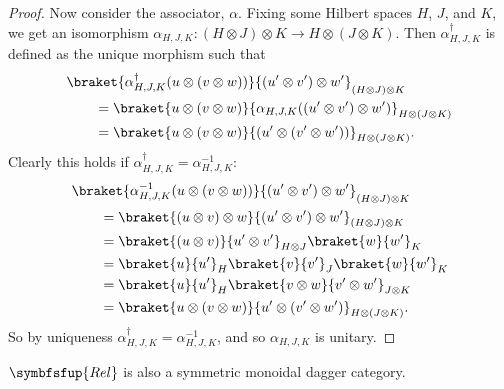 \documentclass[fleqn]{NotesClass}
\makeatletter
\newcommand{\c@egory}[1]{\symbfsfup{#1}}
\newcommand{\Rel}{\c@egory{Rel}}
\makeatother
\begin{document}
\begin{lma}{}{}
\begin{proof}
            Now consider the associator, \(\alpha\).
            Fixing some Hilbert spaces \(H\), \(J\), and \(K\), we get an isomorphism \(\alpha_{H,J,K} \colon (H \otimes J) \otimes K \to H \otimes (J \otimes K)\).
            Then \(\alpha_{H,J,K}^\dagger\) is defined as the unique morphism such that
            \begin{align}
                &\braket{\alpha_{H,J,K}^\dagger(u \otimes (v \otimes w))}{(u' \otimes v') \otimes w'}_{(H\otimes J)\otimes K}\\
                &\qquad= \braket{u \otimes (v \otimes w)}{\alpha_{H,J,K}((u' \otimes v') \otimes w')}_{H\otimes(J\otimes K)}\\
                &\qquad= \braket{u \otimes (v \otimes w)}{(u' \otimes (v' \otimes w'))}_{H\otimes(J\otimes K)}.
            \end{align}
            Clearly this holds if \(\alpha_{H,J,K}^\dagger = \alpha_{H,J,K}^{-1}\):
            \begin{align}
                &\braket{\alpha_{H,J,K}^{-1}(u \otimes (v \otimes w))}{(u' \otimes v') \otimes w'}_{(H\otimes J)\otimes K}\\
                &\qquad= \braket{(u \otimes v) \otimes w}{(u' \otimes v') \otimes w'}_{(H\otimes J)\otimes K}\\
                &\qquad= \braket{(u \otimes v)}{u' \otimes v'}_{H\otimes J}\braket{w}{w'}_K\\
                &\qquad= \braket{u}{u'}_H \braket{v}{v'}_J \braket{w}{w'}_K\\
                &\qquad= \braket{u}{u'}_{H} \braket{v \otimes w}{v' \otimes w'}_{J \otimes K}\\
                &\qquad= \braket{u \otimes (v \otimes w)}{u' \otimes (v' \otimes w')}_{H\otimes(J\otimes K)}.
            \end{align}
            So by uniqueness \(\alpha_{H,J,K}^\dagger = \alpha_{H,J,K}^{-1}\), and so \(\alpha_{H,J,K}\) is unitary.
        \end{proof}
    \end{lma}
    
    \(\Rel\) is also a symmetric monoidal dagger category.
    
    
    
    
    \appendixpage
    \begin{appendices}
        
    \end{appendices}
    
    \backmatter
    \printbibliography
    \printindex
\end{document}
